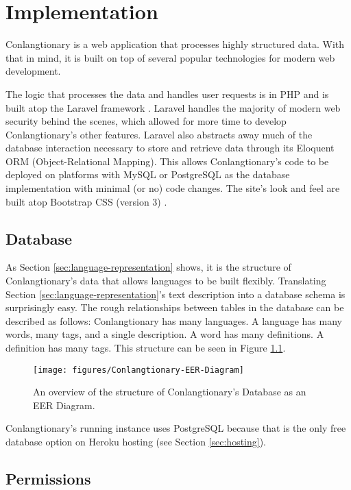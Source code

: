 \chapter{Implementation}
\label{chap:implementation}

Conlangtionary is a web application that processes highly structured data. With that in mind, it is built on top of several popular technologies for modern web development.

The logic that processes the data and handles user requests is in PHP and is built atop the Laravel framework \cite{Laravel}. Laravel handles the majority of modern web security behind the scenes, which allowed for more time to develop Conlangtionary's other features. Laravel also abstracts away much of the database interaction necessary to store and retrieve data through its Eloquent ORM (Object-Relational Mapping). This allows Conlangtionary's code to be deployed on platforms with MySQL or PostgreSQL as the database implementation with minimal (or no) code changes. The site's look and feel are built atop Bootstrap CSS (version 3) \cite{Bootstrap}.

\section{Database}
\label{sec:database}

As Section \ref{sec:language-representation} shows, it is the structure of Conlangtionary's data that allows languages to be built flexibly. Translating Section \ref{sec:language-representation}'s text description into a database schema is surprisingly easy. The rough relationships between tables in the database can be described as follows: Conlangtionary has many languages. A language has many words, many tags, and a single description. A word has many definitions. A definition has many tags. This structure can be seen in Figure \ref{fig:eer-diagram}.

\begin{figure}[h]
\texttt{[image: figures/Conlangtionary-EER-Diagram]}
\caption{An overview of the structure of Conlangtionary's Database as an EER Diagram.}
\centering
\label{fig:eer-diagram}
\end{figure}

Conlangtionary's running instance uses PostgreSQL because that is the only free database option on Heroku hosting (see Section \ref{sec:hosting}).

\section{Permissions}
\label{sec:permissions}

